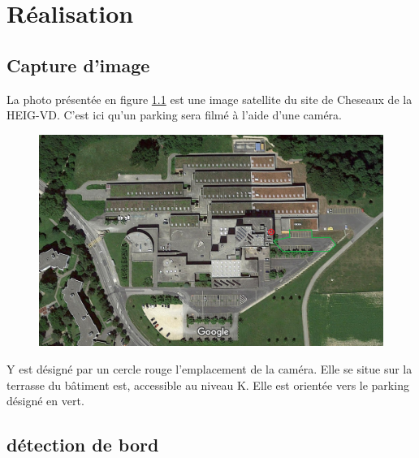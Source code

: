 \chapter{Réalisation}\label{realisation}
\blindtext

\section{Capture d'image}\label{realisation.capture}

La photo présentée en figure \ref{fig:cam_parking_annotation} est une image satellite du site de Cheseaux de la HEIG-VD. C'est ici qu'un parking sera filmé à l'aide d'une caméra.

\begin{figure}[H]
    \includegraphics[width=130mm]{img/conception/cam_parking_location.png}
    \label{fig:cam_parking_annotation}
    \centering
\end{figure}

Y est désigné par un cercle rouge l'emplacement de la caméra. Elle se situe sur la terrasse du bâtiment est, accessible au niveau K. Elle est orientée vers le parking désigné en vert. 

\section{détection de bord}


